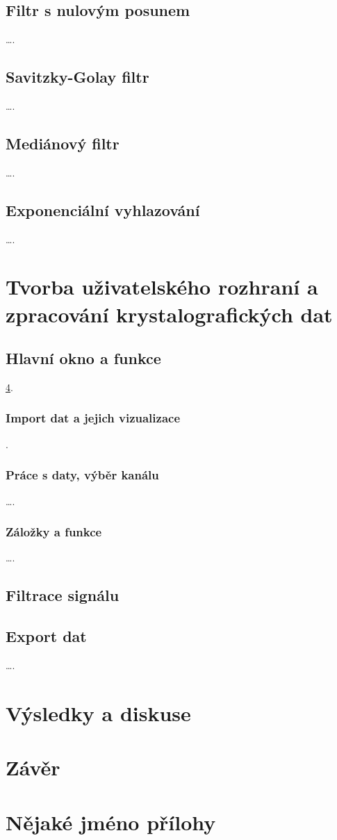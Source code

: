 \documentclass[a4paper, 12pt]{article}
\begin{document}
\subsection{Filtr s nulovým posunem}
\ldots .
\subsection{Savitzky-Golay filtr}
\ldots .
\subsection{Mediánový filtr}
\ldots .
\subsection{Exponenciální vyhlazování}
\ldots .

\newpage
\section{Tvorba uživatelského rozhraní a zpracování krystalografických dat}

\subsection{Hlavní okno a funkce}
\ref{PrilohaA}.
\subsubsection{Import dat a jejich vizualizace}
\cite{petz08}.
\subsubsection{Práce s daty, výběr kanálu}
\ldots .
\subsubsection{Záložky a funkce}
\ldots .

\subsection{Filtrace signálu}

\subsection{Export dat}
\ldots .

\newpage
\section{Výsledky a diskuse}

\newpage
\section{Závěr}


\newpage
{}



\newpage

\appendix

\section{Nějaké jméno přílohy}
\label{PrilohaA}
\end{document}
